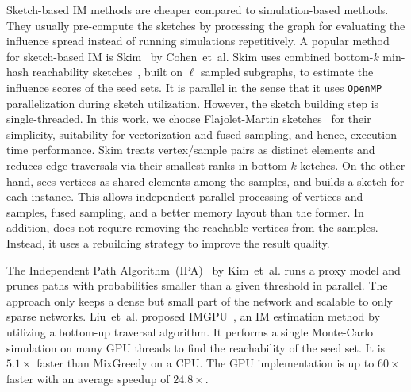 \documentclass[review]{elsarticle}
\newcommand\acro{{\sc{HyperFuseR\xspace}\xspace}\xspace}
\newcommand\kktodo[1]{\textcolor{red}{#1}}
\begin{document}
Sketch-based IM methods are cheaper compared to simulation-based methods. They usually pre-compute the sketches by processing the graph for evaluating the influence spread instead of running simulations repetitively. A popular method for sketch-based IM is {\sc Skim}~\cite{cohen2014sketch} by Cohen~et~al. {\sc Skim} uses combined bottom-$k$ min-hash reachability sketches~\cite{bottomk,cohen2015all}, built on $\ell$ sampled subgraphs, to estimate the influence scores of the seed sets. It is parallel in the sense that it uses {\tt OpenMP} parallelization during sketch utilization. However, the sketch building step is single-threaded. In this work, we choose Flajolet-Martin sketches~\cite{flajolet1985probabilistic} for their simplicity, suitability for vectorization and fused sampling, and hence, execution-time performance. 
 {\sc Skim} treats vertex/sample pairs as distinct elements and reduces edge traversals via their smallest ranks in bottom-$k$ ketches. On the other hand, \acro sees vertices as shared elements among the samples, and builds a sketch for each instance. This allows independent parallel processing of vertices and samples, fused sampling, and a better memory layout than the former. In addition, \acro does not require removing the reachable vertices from the samples. Instead, it uses a rebuilding strategy to improve the result quality.
 
The Independent Path Algorithm~(IPA)~\cite{IPA} by Kim~et~al. runs a proxy model and prunes paths with probabilities smaller than a given threshold in parallel. The approach only keeps a dense but small part of the network and scalable to only sparse networks. Liu~et~al. proposed IMGPU~\cite{IMGPU}, an IM estimation method by utilizing a bottom-up traversal algorithm. It performs a single Monte-Carlo simulation on many GPU threads to find the reachability of the seed set. It is $5.1\times$ faster than {\sc MixGreedy} on a CPU. The GPU implementation is up to $60\times$ faster with an average speedup of  $24.8\times$. 
\end{document}
